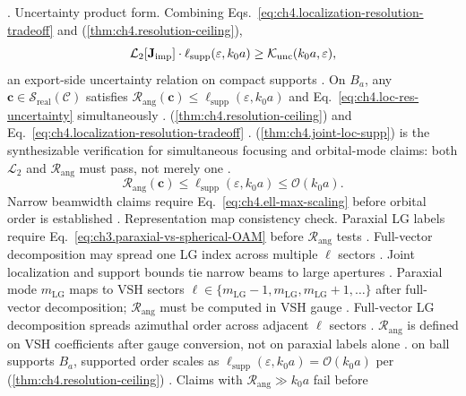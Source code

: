 \cite{hansen1988}.
Uncertainty product form. Combining Eqs.~\eqref{eq:ch4.localization-resolution-tradeoff} and (\ref{thm:ch4.resolution-ceiling}),
\begin{equation}
\label{eq:ch4.loc-res-uncertainty}
\mathcal{L}_{2}[\mathbf{J}_{\mathrm{imp}}]\cdot\ell_{\mathrm{supp}}(\varepsilon,k_{0}a)
\ge
\mathcal{K}_{\mathrm{unc}}(k_{0}a,\varepsilon),
\end{equation}
an export-side uncertainty relation on compact supports \cite{stratton1941}.
\label{thm:ch4.joint-loc-supp}
On \(B_{a}\), any \(\mathbf{c}\in\mathcal{S}_{\mathrm{real}}(\mathcal{C})\) satisfies
\(\mathcal{R}_{\mathrm{ang}}(\mathbf{c})\le\ell_{\mathrm{supp}}(\varepsilon,k_{0}a)\) and Eq.~\eqref{eq:ch4.loc-res-uncertainty} simultaneously
\cite{hansen1988}.
(\ref{thm:ch4.resolution-ceiling}) and Eq.~\eqref{eq:ch4.localization-resolution-tradeoff} \cite{hansen1988}.
(\ref{thm:ch4.joint-loc-supp}) is the synthesizable verification for simultaneous focusing and orbital-mode claims: both \(\mathcal{L}_{2}\) and
\(\mathcal{R}_{\mathrm{ang}}\) must pass, not merely one \cite{harrington2001}.
\begin{equation}
\label{eq:ch4.beamwidth-ell-consistency}
\mathcal{R}_{\mathrm{ang}}(\mathbf{c})\le\ell_{\mathrm{supp}}(\varepsilon,k_{0}a)\le\mathcal{O}(k_{0}a).
\end{equation}
Narrow beamwidth claims require Eq.~\eqref{eq:ch4.ell-max-scaling} before orbital order is established \cite{hansen1988}.
Representation map consistency check. Paraxial LG labels require Eq.~\eqref{eq:ch3.paraxial-vs-spherical-OAM} before \(\mathcal{R}_{\mathrm{ang}}\) tests \cite{harrington2001}.
Full-vector decomposition may spread one LG index across multiple \(\ell\) sectors \cite{hansen1988}. 
Joint localization and support bounds tie narrow beams to large apertures \cite{jackson1999}. 
\label{lem:ch4.lg-vsh-spread}
Paraxial mode \(m_{\mathrm{LG}}\) maps to VSH sectors \(\ell\in\{m_{\mathrm{LG}}-1,m_{\mathrm{LG}},m_{\mathrm{LG}}+1,\ldots\}\) after full-vector
decomposition; \(\mathcal{R}_{\mathrm{ang}}\) must be computed in VSH gauge \cite{harrington2001}.
Full-vector LG decomposition spreads azimuthal order across adjacent \(\ell\) sectors \cite{harrington2001}. \(\mathcal{R}_{\mathrm{ang}}\) is
defined on VSH coefficients after gauge conversion, not on paraxial labels alone \cite{hansen1988}.
on ball supports \(B_{a}\), supported order scales as \(\ell_{\mathrm{supp}}(\varepsilon,k_{0}a)=\mathcal{O}(k_{0}a)\) per
(\ref{thm:ch4.resolution-ceiling}) \cite{hansen1988}. Claims with \(\mathcal{R}_{\mathrm{ang}}\gg k_{0}a\) fail before

